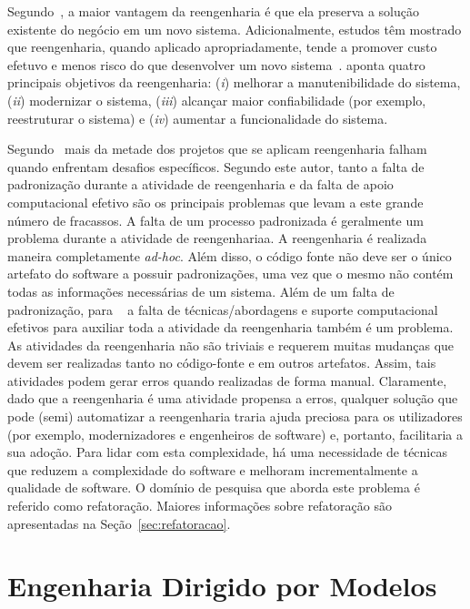 Segundo~, a maior vantagem da reengenharia é que ela preserva a solução existente do negócio em um novo sistema. Adicionalmente, estudos têm mostrado que reengenharia, quando aplicado apropriadamente, tende a promover custo efetuvo e menos risco do que desenvolver um novo sistema~\cite{Sneed_2005}.  aponta quatro principais objetivos da reengenharia: (\textit{i}) melhorar a manutenibilidade do sistema, (\textit{ii}) modernizar o sistema, (\textit{iii}) alcançar maior confiabilidade (por exemplo, reestruturar o sistema) e (\textit{iv}) aumentar a funcionalidade do sistema.


Segundo~ mais da metade dos projetos que se aplicam reengenharia falham quando enfrentam desafios específicos. Segundo este autor, tanto a falta de padronização durante a atividade de reengenharia e da falta de apoio computacional efetivo são os principais problemas que levam a este grande número de fracassos. A falta de um processo padronizada é geralmente um problema durante a atividade de reengenhariaa. A reengenharia é realizada maneira completamente \textit{ad-hoc}. Além disso, o código fonte não deve ser o único artefato do software a possuir padronizações, uma vez que o mesmo não contém todas as informações necessárias de um sistema. Além de um falta de padronização, para ~ a falta de técnicas/abordagens e suporte computacional efetivos para auxiliar toda a atividade da reengenharia também é um problema. As atividades da reengenharia não são triviais e requerem muitas mudanças que devem ser realizadas tanto no código-fonte e em outros artefatos. Assim, tais atividades podem gerar erros quando realizadas de forma manual. Claramente, dado que a reengenharia é uma atividade  propensa a erros, qualquer solução que pode (semi) automatizar a reengenharia traria ajuda preciosa para os utilizadores (por exemplo, modernizadores e engenheiros de software) e, portanto, facilitaria a sua adoção. Para lidar com esta complexidade, há uma necessidade de técnicas que reduzem a complexidade do software e melhoram incrementalmente a qualidade de software. O domínio de pesquisa que aborda este problema é referido como refatoração. Maiores informações sobre refatoração são apresentadas na Seção~\ref{sec:refatoracao}. 

\section{Engenharia Dirigido por Modelos}\label{Cap2_Sec2_Desenvolvimento_Dirigido_a_Modelos}

